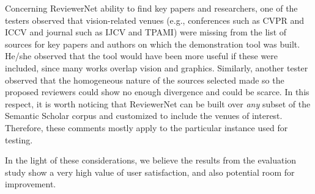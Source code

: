 Concerning ReviewerNet ability to find key papers and researchers, one of the testers observed that vision-related venues (e.g., conferences such as CVPR and ICCV and journal such as IJCV and TPAMI) were missing from the list of sources for key papers and authors on which the demonstration tool was built. He/she observed that the tool would have been more useful if these were included, since many works overlap vision and graphics. Similarly, another tester observed that the homogeneous nature of the sources selected made so the proposed reviewers could show no enough divergence and could be scarce. In this respect, it is worth noticing that ReviewerNet can be built over \emph{any} subset of the Semantic Scholar corpus and customized to include the venues of interest. Therefore, these comments mostly apply to the particular instance used for testing.%

In the light of these considerations, we believe the results from the evaluation study show a very high value of user satisfaction, and also potential room for improvement. 
  







  




   

      